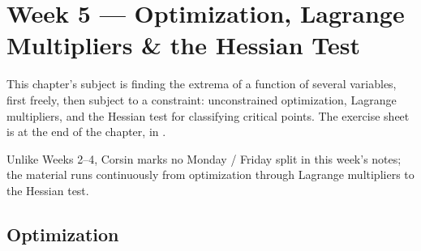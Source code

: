 \chapter{Week 5 --- Optimization, Lagrange Multipliers \& the Hessian Test}

This chapter's subject is finding the extrema of a function of several variables, first freely,
then subject to a constraint: unconstrained optimization, Lagrange multipliers, and the Hessian
test for classifying critical points. The exercise sheet is at the end of the chapter, in
.

\begin{ainote}
Unlike Weeks 2--4, Corsin marks no Monday / Friday split in this week's notes; the material runs
continuously from optimization through Lagrange multipliers to the Hessian test.
\end{ainote}

\section{Optimization}
\label{sec:optimization}

\begin{center}
\end{center}

